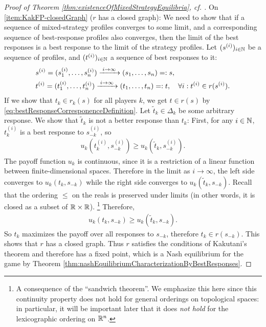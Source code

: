 \documentclass[a4paper,DIV=11,abstracton,twoside=semi]{scrreprt}
\theoremstyle{definition}
\begin{document}
\begin{proof}[Proof of Theorem \ref{thm:existenceOfMixedStrategyEquilibria}, cf. {\cite[p.29]{bib:fudenbergGameTheory}}]
        On \ref{item:KakFP-closedGraph} ($r$ has a closed graph): We need to show that if a sequence of mixed-strategy profiles converges to some limit, and a corresponding sequence of best-response profiles also converges, then the limit of the best responses is a best response to the limit of the strategy profiles. Let $(s^{(i)})_{i \in \mathbb{N}}$ be a sequence of profiles, and $(t^{(i)})_{i \in \mathbb{N}}$ a sequence of best responses to it:
        \begin{align*}
            &s^{(i)} = (s_1^{(i)}, \dots, s_n^{(i)}) \xrightarrow{\;i \to \infty\;} (s_1, \dots, s_n) =: s, \\
            &t^{(i)} = (t_1^{(i)}, \dots, t_n^{(i)}) \xrightarrow{\;i \to \infty\;} (t_1, \dots, t_n) =: t, \quad
            \forall i: t^{(i)} \in r(s^{(i)}).
        \end{align*}
        If we show that $t_k \in r_k(s)$ for all players $k$, we get $t \in r(s)$ by \eqref{eq:bestResponseCorresponenceDefinition}.
        Let 
        $\tilde{t}_k \in \Delta_k$ be some arbitrary response. We show that $\tilde{t}_k$ is not a better response than $t_k$:
        First, for any $i \in \mathbb{N}$, $t^{(i)}_k$ is a best response to $s^{(i)}_{-k}$, so
        \begin{gather*}
            u_k(t^{(i)}_k, s^{(i)}_{-k}) \geq u_k(\tilde{t}_k, s^{(i)}_{-k}).
        \end{gather*}
        The payoff function $u_k$ is continuous, since it is a restriction of a linear function between finite-dimensional spaces. Therefore in the limit as $i \to \infty$, the left side converges to $u_k(t_k, s_{-k})$ while the right side converges to $u_k(\tilde{t}_k, s_{-k})$.
        Recall that the ordering $\leq$ on the reals is preserved under limits (in other words, it is closed as a subset of $\mathbb{R} \times \mathbb{R}$).
        \footnote{A consequence of the “sandwich theorem”. We emphasize this here since this continuity property does not hold for general orderings on topological spaces:
        in particular, it will be important later that it does \emph{not hold} for the lexicographic ordering on $\mathbb{R}^n$.}
        Therefore,
        \begin{gather*}
            u_k(t_k, s_{-k}) \geq u_k(\tilde{t}_k, s_{-k}).
        \end{gather*}
        So $t_k$ maximizes the payoff over all responses to $s_{-k}$, therefore $t_k \in r(s_{-k})$. This shows that $r$ has a closed graph.
        Thus $r$ satisfies the conditions of Kakutani's theorem and therefore has a fixed point, which is a Nash equilibrium for the game by Theorem \ref{thm:nashEquilibriumCharacterizationByBestResponses}.
    \end{proof}
    
\end{document}

